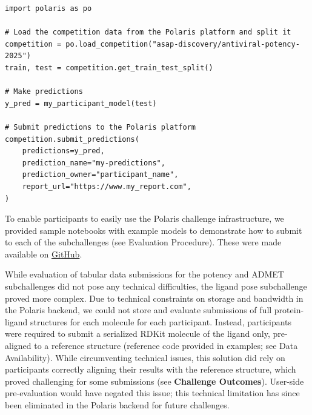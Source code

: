 \documentclass[journal=jcim,manuscript=article]{achemso}
\newenvironment{code}{\captionsetup{type=listing}}{}
\begin{document}
\begin{code}
\label{code:submission}
\begin{verbatim}
import polaris as po

# Load the competition data from the Polaris platform and split it
competition = po.load_competition("asap-discovery/antiviral-potency-2025")
train, test = competition.get_train_test_split()

# Make predictions
y_pred = my_participant_model(test)

# Submit predictions to the Polaris platform
competition.submit_predictions(
    predictions=y_pred,
    prediction_name="my-predictions",
    prediction_owner="participant_name",
    report_url="https://www.my_report.com",
)
\end{verbatim}
\end{code}


To enable participants to easily use the Polaris challenge infrastructure, we provided sample notebooks with example models to demonstrate how to submit to each of the subchallenges (see Evaluation Procedure). These were made available on \href{https://github.com/asapdiscovery/asap-polaris-blind-challenge-examples}{GitHub}. 

While evaluation of tabular data submissions for the potency and ADMET subchallenges did not pose any technical difficulties, the ligand pose subchallenge proved more complex. Due to technical constraints on storage and bandwidth in the Polaris backend, we could not store and evaluate submissions of full protein-ligand structures for each molecule for each participant. Instead, participants were required to submit a serialized RDKit molecule of the ligand only, pre-aligned to a reference structure (reference code provided in examples; see Data Availability). While circumventing technical issues, this solution did rely on participants correctly aligning their results with the reference structure, which proved challenging for some submissions (see \textbf{Challenge Outcomes}). User-side pre-evaluation would have negated this issue; this technical limitation has since been eliminated in the Polaris backend for future challenges.
\end{document}
